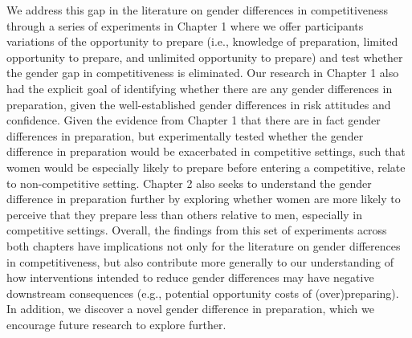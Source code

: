 \documentclass[a4paper,nobind]{templates/ociamthesis}
\newcommand*{\bibtitle}{References}
\begin{document}
We address this gap in the literature on gender differences in competitiveness through a series of experiments in Chapter 1 where we offer participants variations of the opportunity to prepare (i.e., knowledge of preparation, limited opportunity to prepare, and unlimited opportunity to prepare) and test whether the gender gap in competitiveness is eliminated. Our research in Chapter 1 also had the explicit goal of identifying whether there are any gender differences in preparation, given the well-established gender differences in risk attitudes and confidence. Given the evidence from Chapter 1 that there are in fact gender differences in preparation, but experimentally tested whether the gender difference in preparation would be exacerbated in competitive settings, such that women would be especially likely to prepare before entering a competitive, relate to non-competitive setting. Chapter 2 also seeks to understand the gender difference in preparation further by exploring whether women are more likely to perceive that they prepare less than others relative to men, especially in competitive settings. Overall, the findings from this set of experiments across both chapters have implications not only for the literature on gender differences in competitiveness, but also contribute more generally to our understanding of how interventions intended to reduce gender differences may have negative downstream consequences (e.g., potential opportunity costs of (over)preparing). In addition, we discover a novel gender difference in preparation, which we encourage future research to explore further.




\setlength{\baselineskip}{0pt} %

{\renewcommand*\MakeUppercase[1]{#1}%
\printbibliography[heading=bibintoc,title={\bibtitle}]}
\end{document}
